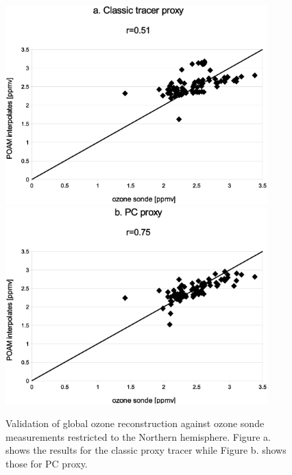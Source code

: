 \begin{figure}
  \centering
  \includegraphics[width=0.9\textwidth]{global_classic_sonde_Nhemi}
  \includegraphics[width=0.9\textwidth]{global_PC_sonde_Nhemi}
  \caption{Validation of global ozone reconstruction against ozone sonde measurements restricted to the Northern hemisphere.
  Figure a. shows the results for the classic proxy tracer while Figure b. shows those for PC proxy.}
  \label{Nhemi_restrict}
\end{figure}

